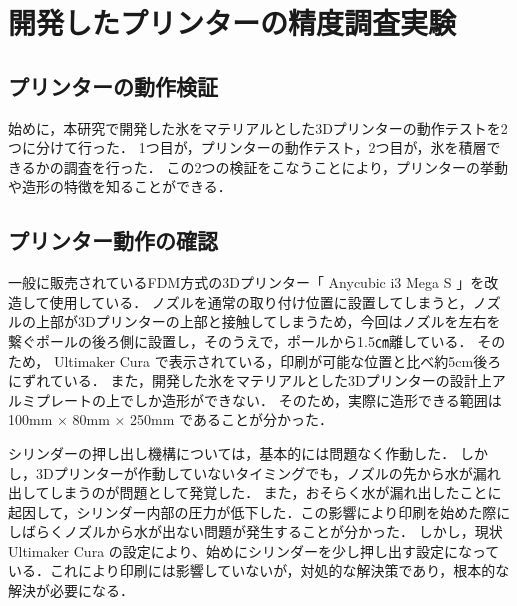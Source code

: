 \chapter{開発したプリンターの精度調査実験}
\label{chp:first}

\section{プリンターの動作検証}
\label{sec:paragraph}
始めに，本研究で開発した氷をマテリアルとした3Dプリンターの動作テストを2つに分けて行った．
1つ目が，プリンターの動作テスト，2つ目が，氷を積層できるかの調査を行った．
この2つの検証をこなうことにより，プリンターの挙動や造形の特徴を知ることができる．

\section{プリンター動作の確認}
\label{sec:paragraph}
一般に販売されているFDM方式の3Dプリンター「 Anycubic i3 Mega S 」を改造して使用している．
ノズルを通常の取り付け位置に設置してしまうと，ノズルの上部が3Dプリンターの上部と接触してしまうため，今回はノズルを左右を繋ぐポールの後ろ側に設置し，そのうえで，ポールから1.5㎝離している．
そのため， Ultimaker Cura で表示されている，印刷が可能な位置と比べ約5cm後ろにずれている．
また，開発した氷をマテリアルとした3Dプリンターの設計上アルミプレートの上でしか造形ができない．
そのため，実際に造形できる範囲は 100mm × 80mm × 250mm であることが分かった．

シリンダーの押し出し機構については，基本的には問題なく作動した．
しかし，3Dプリンターが作動していないタイミングでも，ノズルの先から水が漏れ出してしまうのが問題として発覚した．
また，おそらく水が漏れ出したことに起因して，シリンダー内部の圧力が低下した．この影響により印刷を始めた際にしばらくノズルから水が出ない問題が発生することが分かった．
しかし，現状 Ultimaker Cura の設定により、始めにシリンダーを少し押し出す設定になっている．これにより印刷には影響していないが，対処的な解決策であり，根本的な解決が必要になる．


